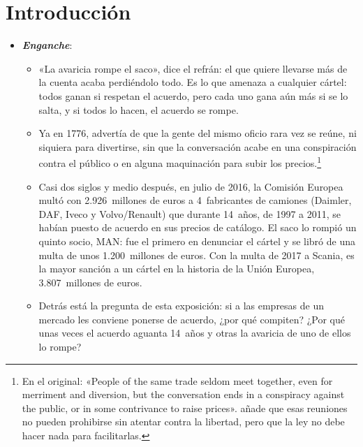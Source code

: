 \documentclass[11pt]{article}
\begin{document}
\tceetitulo

\section*{Introducción}

\begin{itemize}
\item \textbf{\emph{Enganche}}:
  \begin{itemize}
  \item «La avaricia rompe el saco», dice el refrán: el que quiere llevarse más de la cuenta acaba perdiéndolo todo. Es lo que amenaza a cualquier cártel: todos ganan si respetan el acuerdo, pero cada uno gana aún más si se lo salta, y si todos lo hacen, el acuerdo se rompe.
  \item Ya en 1776,  advertía de que la gente del mismo oficio rara vez se reúne, ni siquiera para divertirse, sin que la conversación acabe en una conspiración contra el público o en alguna maquinación para subir los precios\nocite{Smith1776Wealth}.\footnote{En el original: «People of the same trade seldom meet together, even for merriment and diversion, but the conversation ends in a conspiracy against the public, or in some contrivance to raise prices».  añade que esas reuniones no pueden prohibirse sin atentar contra la libertad, pero que la ley no debe hacer nada para facilitarlas.}
  \item Casi dos siglos y medio después, en julio de 2016, la Comisión Europea multó con 2.926~millones de euros a 4~fabricantes de camiones (Daimler, DAF, Iveco y Volvo/Renault) que durante 14~años, de 1997 a 2011, se habían puesto de acuerdo en sus precios de catálogo. El saco lo rompió un quinto socio, MAN: fue el primero en denunciar el cártel y se libró de una multa de unos 1.200~millones de euros\nocite{CE2016Camiones}. Con la multa de 2017 a Scania, es la mayor sanción a un cártel en la historia de la Unión Europea, 3.807~millones de euros\nocite{CE2026CartelStatistics}.
  \item Detrás está la pregunta de esta exposición: si a las empresas de un mercado les conviene ponerse de acuerdo, ¿por qué compiten? ¿Por qué unas veces el acuerdo aguanta 14~años y otras la avaricia de uno de ellos lo rompe?
  \end{itemize}


\end{itemize}
\end{document}
